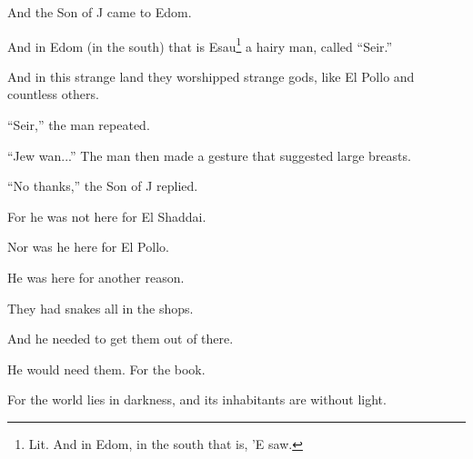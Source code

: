 
{ \hX{} }
{ \eX{} }
{
    And the Son of J came to Edom.

    And in Edom (in the south) that is Esau\footnote{Lit. And in Edom, in the
    south that is, 'E saw.} a hairy man, called ``Seir.''
}
{ \hX{} }
{ \eX{} }
{
    And in this strange land they worshipped strange gods, like El Pollo and
    countless others.

    ``Seir,'' the man repeated.

    ``Jew wan...'' The man then made a gesture that suggested large breasts.

    ``No thanks,'' the Son of J replied.
}
{ \hX{} }
{ \eX{} }
{
    For he was not here for El Shaddai.

    Nor was he here for El Pollo.

    He was here for another reason.
}
{ \hX{} }
{ \eX{} }
{
    They had snakes all in the shops.

    And he needed to get them out of there.

    He would need them. For the book.
}
{ \hX{} }
{ \eX{} }
{ For the world lies in darkness, and its inhabitants are without light. }
